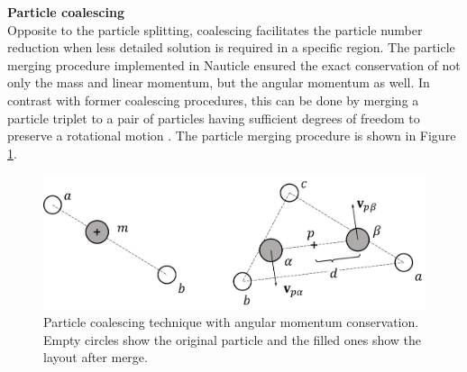 \documentclass[a4paper,12pt,openany]{book}
\theoremstyle{break}
\begin{document}
\textbf{Particle coalescing}\\
Opposite to the particle splitting, coalescing facilitates the particle number reduction when less detailed solution is required in a specific region. The particle merging procedure implemented in Nauticle ensured the exact conservation of not only the mass and linear momentum, but the angular momentum as well. In contrast with former coalescing procedures, this can be done by merging a particle triplet to a pair of particles having sufficient degrees of freedom to preserve a rotational motion \cite{Toth2018}. The particle merging procedure is shown in Figure \ref{fig:merging}.
\begin{figure}[H]
  \includegraphics[scale=0.4]{particle_coalescing_draw.pdf}
  \centering
  \caption{Particle coalescing technique with angular momentum conservation. Empty circles show the original particle and the filled ones show the layout after merge.}
  \label{fig:merging}
\end{figure}\vspace*{3pt}
\end{document}
